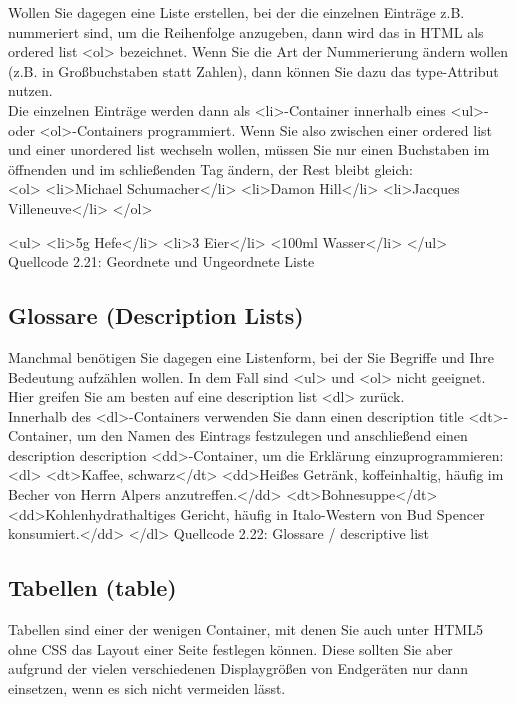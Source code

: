 Wollen Sie dagegen eine Liste erstellen, bei der die einzelnen Einträge z.B. nummeriert sind, um die Reihenfolge anzugeben, dann wird das in HTML als ordered list <ol> bezeichnet. Wenn Sie die Art der Nummerierung ändern wollen (z.B. in Großbuchstaben statt Zahlen), dann können Sie dazu das type-Attribut nutzen.\\

Die einzelnen Einträge werden dann als <li>-Container innerhalb eines <ul>- oder <ol>-Containers programmiert. Wenn Sie also zwischen einer ordered list und einer unordered list wechseln wollen, müssen Sie nur einen Buchstaben im öffnenden und im schließenden Tag ändern, der Rest bleibt gleich:\\

<ol>
<li>Michael Schumacher</li>
<li>Damon Hill</li>
<li>Jacques Villeneuve</li>
</ol>

<ul>
<li>5g Hefe</li>
<li>3 Eier</li>
<100ml Wasser</li>
</ul>
Quellcode 2.21: Geordnete und Ungeordnete Liste

\subsection{Glossare (Description Lists)}

Manchmal benötigen Sie dagegen eine Listenform, bei der Sie Begriffe und Ihre Bedeutung aufzählen wollen. In dem Fall sind <ul> und <ol> nicht geeignet. Hier greifen Sie am besten auf eine description list <dl> zurück.\\

Innerhalb des <dl>-Containers verwenden Sie dann einen description title <dt>-Container, um den Namen des Eintrags festzulegen und anschließend einen description description <dd>-Container, um die Erklärung einzuprogrammieren:\\

<dl>
<dt>Kaffee, schwarz</dt>
<dd>Heißes Getränk, koffeinhaltig, häufig im Becher von Herrn Alpers anzutreffen.</dd>
<dt>Bohnesuppe</dt>
<dd>Kohlenhydrathaltiges Gericht, häufig in Italo-Western von Bud Spencer konsumiert.</dd>
</dl>
Quellcode 2.22: Glossare / descriptive list

\subsection{Tabellen (table)}

Tabellen sind einer der wenigen Container, mit denen Sie auch unter HTML5 ohne CSS das Layout einer Seite festlegen können. Diese sollten Sie aber aufgrund der vielen verschiedenen Displaygrößen von Endgeräten nur dann einsetzen, wenn es sich nicht vermeiden lässt.\\


